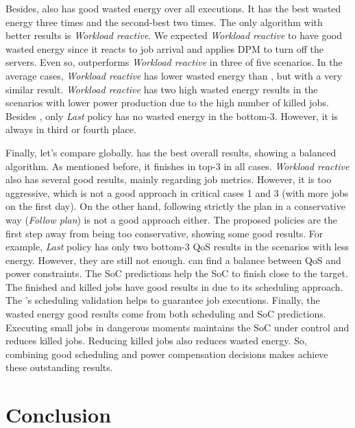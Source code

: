 Besides, \emph{\systemName} also has good wasted energy over all executions. It has the best wasted energy three times and the second-best two times. The only algorithm with better results is \emph{Workload reactive}. We expected \emph{Workload reactive} to have good wasted energy since it reacts to job arrival and applies DPM to turn off the servers. Even so, \emph{\systemName} outperforms \emph{Workload reactive} in three of five scenarios. In the average cases, \emph{Workload reactive} has lower wasted energy than \emph{\systemName}, but with a very similar result. \emph{Workload reactive} has two high wasted energy results in the scenarios with lower power production due to the high number of killed jobs. Besides \emph{\systemName}, only \emph{Last} policy has no wasted energy in the bottom-3. However, it is always in third or fourth place.

Finally, let's compare \emph{\systemName} globally. \emph{\systemName} has the best overall results, showing a balanced algorithm. As mentioned before, it finishes in top-3 in all cases. \emph{Workload reactive} also has several good results, mainly regarding job metrics. However, it is too aggressive, which is not a good approach in critical cases 1 and 3 (with more jobs on the first day). On the other hand, following strictly the plan in a conservative way (\emph{Follow plan}) is not a good approach either. The proposed policies are the first step away from being too conservative, showing some good results. For example, \emph{Last} policy has only two bottom-3 QoS results in the scenarios with less energy. However, they are still not enough. \emph{\systemName} can find a balance between QoS and power constraints. The SoC predictions help the SoC to finish close to the target. The finished and killed jobs have good results in \emph{\systemName} due to its scheduling approach. The \emph{\systemName}'s scheduling validation helps to guarantee job executions. Finally, the wasted energy good results come from both scheduling and SoC predictions. Executing small jobs in dangerous moments maintains the SoC under control and reduces killed jobs. Reducing killed jobs also reduces wasted energy. So, combining good scheduling and power compensation decisions makes \emph{\systemName} achieve these outstanding results.



\section{Conclusion}

